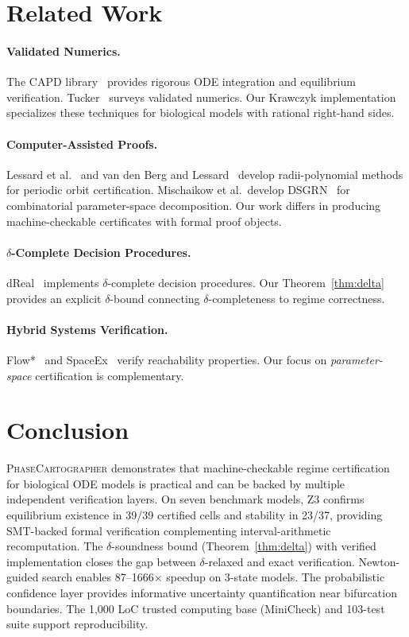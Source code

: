 \documentclass[11pt]{article}
\newcommand{\PC}{\textsc{PhaseCartographer}}
\begin{document}
\section{Related Work}
\label{sec:related}

\paragraph{Validated Numerics.}
The CAPD library~\cite{kapela2021capd} provides rigorous ODE integration and equilibrium verification.
Tucker~\cite{tucker2011validated} surveys validated numerics.
Our Krawczyk implementation specializes these techniques for biological models with rational right-hand sides.

\paragraph{Computer-Assisted Proofs.}
Lessard et al.~\cite{lessard2014computer} and van den Berg and Lessard~\cite{vandenberg2015rigorous} develop radii-polynomial methods for periodic orbit certification.
Mischaikow et al.\ develop DSGRN~\cite{cummins2016dsgrn} for combinatorial parameter-space decomposition.
Our work differs in producing machine-checkable certificates with formal proof objects.

\paragraph{$\delta$-Complete Decision Procedures.}
dReal~\cite{gao2013dreal} implements $\delta$-complete decision procedures.
Our Theorem~\ref{thm:delta} provides an explicit $\delta$-bound connecting $\delta$-completeness to regime correctness.

\paragraph{Hybrid Systems Verification.}
Flow*~\cite{chen2013flow} and SpaceEx~\cite{frehse2011spaceex} verify reachability properties.
Our focus on \emph{parameter-space} certification is complementary.

\section{Conclusion}
\label{sec:conclusion}

\PC{} demonstrates that machine-checkable regime certification for biological ODE models is practical and can be backed by multiple independent verification layers.
On seven benchmark models, Z3 confirms equilibrium existence in 39/39 certified cells and stability in 23/37, providing SMT-backed formal verification complementing interval-arithmetic recomputation.
The $\delta$-soundness bound (Theorem~\ref{thm:delta}) with verified implementation closes the gap between $\delta$-relaxed and exact verification.
Newton-guided search enables 87--1666$\times$ speedup on 3-state models.
The probabilistic confidence layer provides informative uncertainty quantification near bifurcation boundaries.
The 1,000 LoC trusted computing base (MiniCheck) and 103-test suite support reproducibility.
\end{document}
